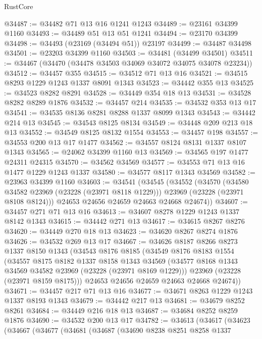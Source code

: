 \begin{lexlean}{RustCore}
\begin{coremodule}
@34487 := @34482 @71 @13 @16 @1241 @1243
@34489 := @23161 @34399 @1160
@34493 := @34489 @51 @13 @51 @1241
@34494 := @23170 @34399
@34498 := @34493 (@23169 (@34494 @51)) @23197
@34499 := @34487 @34498
@34501 := @23203 @34399 @1160
@34503 := @34481 (@34499 @34501)
@34511 := @34467 (@34470 (@34478 @34503 @34069 @34072 @34075 @34078 @23234))
@34512 := @34457 @355
@34515 := @34512 @71 @13 @16
@34521 := @34515 @8293 @1229 @1243 @1337 @8091 @1343
@34523 := @34442 @355 @13
@34525 := @34523 @8282 @8291
@34528 := @34449 @354 @18 @13
@34531 := @34528 @8282 @8289 @1876
@34532 := @34457 @214
@34535 := @34532 @353 @13 @17
@34541 := @34535 @8136 @8281 @8288 @1337 @8099 @1343
@34543 := @34442 @214 @13
@34545 := @34543 @8125 @8134
@34549 := @34448 @209 @213 @18 @13
@34552 := @34549 @8125 @8132 @1554
@34553 := @34457 @198
@34557 := @34553 @200 @13 @17 @1477
@34562 := @34557 @8124 @8131 @1337 @8107 @1343
@34565 := @24062 @34399 @1160 @13
@34569 := @34565 @197 @1477 @24311 @24315
@34570 := @34562 @34569
@34577 := @34553 @71 @13 @16 @1477 @1229 @1243 @1337
@34580 := @34577 @8117 @1343 @34569
@34582 := @23963 @34399 @1160
@34603 := @34541
    (@34545
      (@34552
        (@34570
          (@34580 @34582 @23969 (@23228 (@23971 @8118 @1229)))
          @23969
          (@23228 (@23971 @8108 @8124)))
        @24653
        @24656
        @24659
        @24663
        @24668
        @24674))
@34607 := @34457 @271 @71 @13 @16
@34613 := @34607 @8278 @1229 @1243 @1337 @8142 @1343
@34615 := @34442 @271 @13
@34617 := @34615 @8267 @8276
@34620 := @34449 @270 @18 @13
@34623 := @34620 @8267 @8274 @1876
@34626 := @34532 @269 @13 @17
@34667 := @34626
    @8187
    @8266
    @8273
    @1337
    @8150
    @1343
    (@34543
      @8176
      @8185
      (@34549
        @8176
        @8183
        @1554
        (@34557
          @8175
          @8182
          @1337
          @8158
          @1343
          @34569
          (@34577 @8168 @1343 @34569 @34582 @23969 (@23228 (@23971 @8169 @1229)))
          @23969
          (@23228 (@23971 @8159 @8175)))
        @24653
        @24656
        @24659
        @24663
        @24668
        @24674))
@34671 := @34457 @217 @71 @13 @16
@34677 := @34671 @8263 @1229 @1243 @1337 @8193 @1343
@34679 := @34442 @217 @13
@34681 := @34679 @8252 @8261
@34684 := @34449 @216 @18 @13
@34687 := @34684 @8252 @8259 @1876
@34690 := @34532 @200 @13 @17
@34782 := @34613
    (@34617
      (@34623
        (@34667
          (@34677
            (@34681
              (@34687
                (@34690
                  @8238
                  @8251
                  @8258
                  @1337

\end{coremodule}
\end{lexlean}
